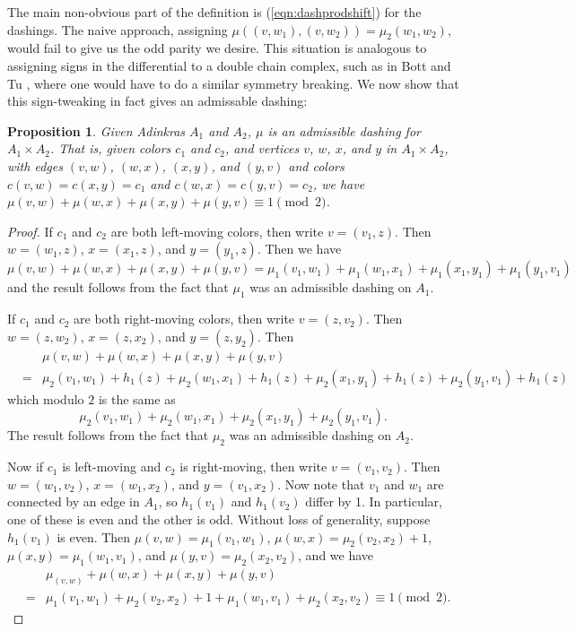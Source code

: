 \documentclass[12pt,twoside,singlespace]{article}
\numberwithin{equation}{section}
\newtheorem{prop}[equation]{Proposition}
\theoremstyle{definition}
\begin{document}
The main non-obvious part of the definition is (\ref{eqn:dashprodshift}) for the dashings. The naive approach, assigning $\mu((v,w_1), (v,w_2)) = \mu_2(w_1, w_2)$, would fail to give us the odd parity we desire. This situation is analogous to assigning signs in the differential to a double chain complex, such as in Bott and Tu \cite{bott_tu}, where one would have to do a similar symmetry breaking. We now show that this sign-tweaking in fact gives an admissable dashing:

\begin{prop}
\label{prop:product-admissable}
Given Adinkras $A_1$ and $A_2$, $\mu$ is an admissible dashing for $A_1\times A_2$.  That is, given colors $c_1$ and $c_2$, and vertices $v$, $w$, $x$, and $y$ in $A_1\times A_2$, with edges $(v,w)$, $(w,x)$, $(x,y)$, and $(y,v)$ and colors $c(v,w)=c(x,y)=c_1$ and $c(w,x)=c(y,v)=c_2$, we have $\mu(v,w)+\mu(w,x)+\mu(x,y)+\mu(y,v)\equiv 1 \pmod{2}$.
\end{prop}
\begin{proof}
If $c_1$ and $c_2$ are both left-moving colors, then write $v=(v_1,z)$.  Then $w=(w_1,z)$, $x=(x_1,z)$, and $y=(y_1,z)$.  Then we have
\[\mu(v,w)+\mu(w,x)+\mu(x,y)+\mu(y,v)
= \mu_1(v_1,w_1)+\mu_1(w_1,x_1)+\mu_1(x_1,y_1)+\mu_1(y_1,v_1)\]
and the result follows from the fact that $\mu_1$ was an admissible dashing on $A_1$.

If $c_1$ and $c_2$ are both right-moving colors, then write $v=(z,v_2)$.  Then $w=(z,w_2)$, $x=(z,x_2)$, and $y=(z,y_2)$.  Then
\begin{eqnarray*}
&&\mu(v,w)+\mu(w,x)+\mu(x,y)+\mu(y,v)\\
&=& \mu_2(v_1,w_1)+h_1(z)+\mu_2(w_1,x_1)+h_1(z)+\mu_2(x_1,y_1)+h_1(z)+\mu_2(y_1,v_1)+h_1(z)
\end{eqnarray*}
which modulo $2$ is the same as 
\[\mu_2(v_1,w_1)+\mu_2(w_1,x_1)+\mu_2(x_1,y_1)+\mu_2(y_1,v_1).\]
The result follows from the fact that $\mu_2$ was an admissible dashing on $A_2$.


Now if $c_1$ is left-moving and $c_2$ is right-moving, then write $v=(v_1,v_2)$.  Then $w=(w_1,v_2)$, $x=(w_1,x_2)$, and $y=(v_1,x_2)$.  Now note that $v_1$ and $w_1$ are connected by an edge in $A_1$, so $h_1(v_1)$ and $h_1(v_2)$ differ by 1.  In particular, one of these is even and the other is odd.  Without loss of generality, suppose $h_1(v_1)$ is even.  Then $\mu(v,w)=\mu_1(v_1,w_1)$, $\mu(w,x)=\mu_2(v_2,x_2)+1$, $\mu(x,y)=\mu_1(w_1,v_1)$, and $\mu(y,v)=\mu_2(x_2,v_2)$, and we have
\begin{eqnarray*}
&&\mu_(v,w)+\mu(w,x)+\mu(x,y)+\mu(y,v)\\
&=&\mu_1(v_1,w_1)+\mu_2(v_2,x_2)+1+\mu_1(w_1,v_1)+\mu_2(x_2,v_2)\equiv 1\pmod{2}.
\end{eqnarray*}
\end{proof}
\end{document}
